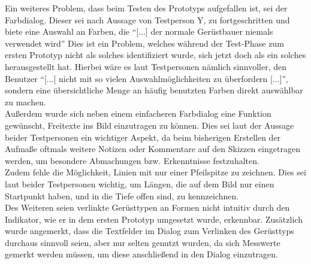 Ein weiteres Problem, dass beim Testen des Prototyps aufgefallen ist, sei der Farbdialog.
Dieser sei nach Aussage von Testperson Y, zu fortgeschritten und biete eine Auswahl an Farben, die ``[...] der normale Gerüstbauer niemals verwendet wird'' 
Dies ist ein Problem, welches während der Test-Phase zum ersten Prototyp nicht als solches identifiziert wurde, sich jetzt doch als ein solches herausgestellt hat.
Hierbei wäre es laut Testpersonen nämlich sinnvoller, den Benutzer ``[...] nicht mit so vielen Auswahlmöglichkeiten zu überfordern [...]'', sondern eine übersichtliche Menge an häufig benutzten Farben direkt auswählbar zu machen. \\

Außerdem wurde sich neben einem einfacheren Farbdialog eine Funktion gewünscht, Freitexte ins Bild einzutragen zu können. 
Dies sei laut der Aussage beider Testpersonen ein wichtiger Aspekt, da beim bisherigen Erstellen der Aufmaße oftmals weitere Notizen oder Kommentare auf den Skizzen eingetragen werden, um besondere Abmachungen bzw. Erkenntnisse festzuhalten. \\

Zudem fehle die Möglichkeit, Linien mit nur einer Pfeilspitze zu zeichnen.
Dies sei laut beider Testpersonen wichtig, um Längen, die auf dem Bild nur einen Startpunkt haben, und in die Tiefe offen sind, zu kennzeichnen. \\

Des Weiteren seien verlinkte Gerüsttypen an Formen nicht intuitiv durch den Indikator, wie er in dem ersten Prototyp umgesetzt wurde, erkennbar.
Zusätzlich wurde angemerkt, dass die Textfelder im Dialog zum Verlinken des Gerüsttyps durchaus sinnvoll seien, aber nur selten genutzt wurden, da sich Messwerte gemerkt werden müssen, um diese anschließend in den Dialog einzutragen. \\
